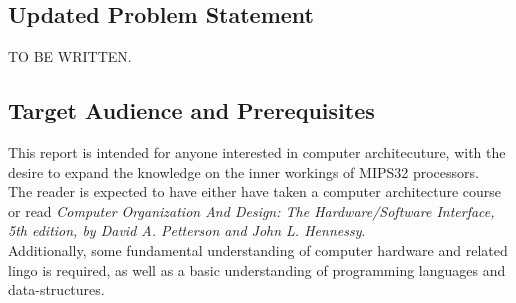 \subsection*{Updated Problem Statement}
TO BE WRITTEN.

\subsection*{Target Audience and Prerequisites}
This report is intended for anyone interested in computer architecuture, with
the desire to expand the knowledge on the inner workings of MIPS32 processors.\\
The reader is expected to have either have taken a computer architecture course
or read \textit{Computer Organization And Design: The Hardware/Software Interface, 5th
edition, by David A. Petterson and John L. Hennessy}.\\
Additionally, some fundamental understanding of computer hardware and related lingo is required,
as well as a basic understanding of programming languages and data-structures.
